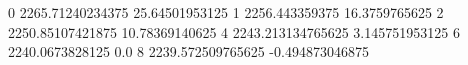 0 2265.71240234375 25.64501953125
1 2256.443359375 16.3759765625
2 2250.85107421875 10.78369140625
4 2243.213134765625 3.145751953125
6 2240.0673828125 0.0
8 2239.572509765625 -0.494873046875
